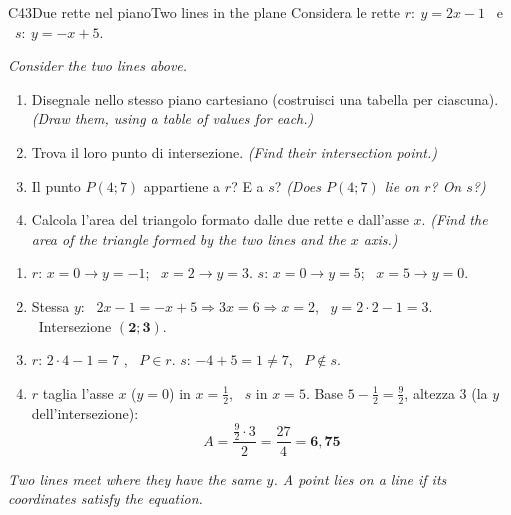 \documentclass[11pt,a4paper]{article}
\newcommand{\en}[1]{\par{\small\itshape\color{engray}#1\par}}
\newcommand{\enx}[1]{{\small\itshape\color{engray}(#1)}}
\newcounter{sezione}
\begin{document}
\begin{esercizio}{C4}{3}{Due rette nel piano}{Two lines in the plane}
Considera le rette $r:\ y=2x-1$ \ e \ $s:\ y=-x+5$.
\en{Consider the two lines above.}
\begin{enumerate}
\item Disegnale nello stesso piano cartesiano (costruisci una tabella per ciascuna). \enx{Draw them, using a table of values for each.}
\item Trova il loro punto di intersezione. \enx{Find their intersection point.}
\item Il punto $P(4;7)$ appartiene a $r$? E a $s$? \enx{Does $P(4;7)$ lie on $r$? On $s$?}
\item Calcola l'area del triangolo formato dalle due rette e dall'asse $x$. \enx{Find the area of the triangle formed by the two lines and the $x$ axis.}
\end{enumerate}
\end{esercizio}
\begin{solbox}
\begin{minipage}{0.54\linewidth}
\begin{enumerate}
\item $r$: $x=0\to y=-1$; \ $x=2\to y=3$. \quad $s$: $x=0\to y=5$; \ $x=5\to y=0$.
\item Stessa $y$: \ $2x-1=-x+5\Rightarrow 3x=6\Rightarrow x=2$, \ $y=2\cdot2-1=3$. \ Intersezione $\mathbf{(2;3)}$.
\item $r$: $2\cdot4-1=7$ \checkmark, \ $P\in r$. \quad $s$: $-4+5=1\ne7$, \ $P\notin s$.
\item $r$ taglia l'asse $x$ ($y=0$) in $x=\frac12$, \ $s$ in $x=5$. Base $5-\frac12=\frac92$, altezza $3$ (la $y$ dell'intersezione):
\[A=\frac{\frac92\cdot3}{2}=\frac{27}{4}=\mathbf{6,75}\]
\end{enumerate}
\en{Two lines meet where they have the same $y$. A point lies on a line if its coordinates satisfy the equation.}
\end{minipage}\hfill
\begin{minipage}{0.43\linewidth}\centering
{}
\end{minipage}
\end{solbox}
\end{document}
